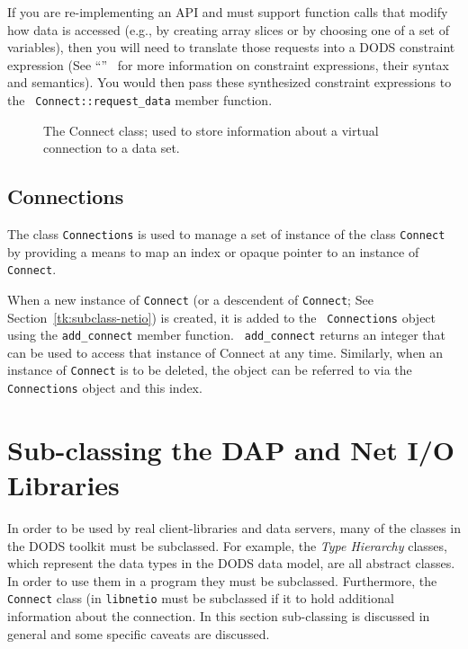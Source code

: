 If you are re-implementing an API and must support function calls that modify
how data is accessed (e.g., by creating array slices or by choosing one of a
set of variables), then you will need to translate those requests into a DODS
constraint expression (See ``\DAP''~ for more
information on constraint expressions, their syntax and semantics). You would
then pass these synthesized constraint expressions to the {\tt
  Connect::request\_data} member function.

\begin{figure}
\centerline{}
\caption{The Connect class; used to store information about a virtual
connection to a data set.}
\label{fig:connect-diagram}
\end{figure}

\subsection{Connections}

The class {\tt Connections} is used to manage a set of instance of the class
{\tt Connect} by providing a means to map an index or opaque pointer to an
instance of {\tt Connect}. 

When a new instance of {\tt Connect} (or a descendent of {\tt Connect}; See
Section~\ref{tk:subclass-netio}) is created, it is added to the {\tt
  Connections} object using the {\tt add\_connect} member function. {\tt
  add\_connect} returns an integer that can be used to access that instance
of Connect at any time. Similarly, when an instance of {\tt Connect} is to be
deleted, the object can be referred to via the {\tt Connections} object and
this index.

\section{Sub-classing the DAP and Net I/O Libraries}
\label{tk:subclassing}

In order to be used by real client-libraries and data servers, many of the
classes in the DODS toolkit must be subclassed. For example, the {\em Type
Hierarchy\/} classes, which represent the data types in the DODS data model,
are all abstract classes. In order to use them in a program they must be
subclassed. Furthermore, the {\tt Connect} class (in {\tt libnetio} must be
subclassed if it to hold additional information about the connection. In this
section sub-classing is discussed in general and some specific caveats are
discussed. 

